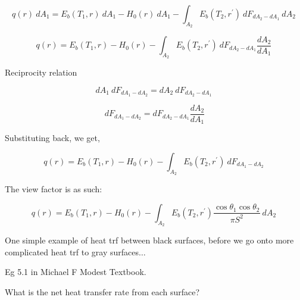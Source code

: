 \documentclass[12pt]{article}
\renewcommand{\_}{\kern-1.5pt\textunderscore\kern-1.5pt}
\begin{document}
\vspace{\baselineskip}
\par

\par

\par

 \[ q \left( r \right) ~dA_{1}=E_{b} \left( T_{1},r \right) ~dA_{1}-H_{0} \left( r \right) ~dA_{1}- \int _{A_{2}}^{}E_{b} \left( T_{2},r^{'} \right) ~dF_{dA_{2}-dA_{1}}~dA_{2}~ \] \par

 \[ q \left( r \right)  =E_{b} \left( T_{1},r \right) -H_{0} \left( r \right)  - \int _{A_{2}}^{}E_{b} \left( T_{2},r^{'} \right) ~dF_{dA_{2}-dA_{1}}\frac{dA_{2}}{dA_{1}}~ \] \par

Reciprocity relation\par

 \[ dA_{1}~dF_{dA_{1}-dA_{2}}=dA_{2}~dF_{dA_{2}-dA_{1}}~ \] \par

 \[ dF_{dA_{1}-dA_{2}}=dF_{dA_{2}-dA_{1}}\frac{dA_{2}}{dA_{1}} \] \par

Substituting back, we get,\par

 \[ q \left( r \right)  =E_{b} \left( T_{1},r \right) -H_{0} \left( r \right)  - \int _{A_{2}}^{}E_{b} \left( T_{2},r^{'} \right) ~dF_{dA_{1}-dA_{2}}~ \] \par

The view factor is as such:\par

\par

\par

 \[ q \left( r \right)  =E_{b} \left( T_{1},r \right) -H_{0} \left( r \right)  - \int _{A_{2}}^{}E_{b} \left( T_{2},r^{'} \right) \frac{\cos  \theta _{1}\cos  \theta _{2}}{ \pi S^{2}}~dA_{2}~ \] \par

One simple example of heat trf between black surfaces, before we go onto more complicated heat trf to gray surfaces$ \ldots $ \par

Eg 5.1 in Michael F Modest Textbook.\par

\par

What is the net heat transfer rate from each surface?\par
\end{document}
